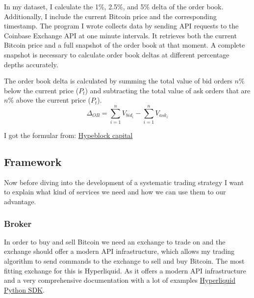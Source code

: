 \documentclass[12pt]{article}
\begin{document}
In my dataset, I calculate the 1\%, 2.5\%, and 5\% delta of the order book. Additionally, I include the current Bitcoin price and the corresponding timestamp. The program I wrote collects data by sending API requests to the Coinbase Exchange API at one minute intervals. It retrieves both the current Bitcoin price and a full snapshot of the order book at that moment. A complete snapshot is necessary to calculate order book deltas at different percentage depths accurately.


\newpage
The order book delta is calculated by summing the total value of bid orders $n\%$ below the current price ($P_t$) and subtracting the total value of ask orders that are $n\%$ above the current price ($P_t$).
\begin{equation*}
    \Delta_{OB} = \sum_{i=1}^{n} V_{bid_i} - \sum_{i=1}^{n} V_{ask_i}
\end{equation*}

I got the formular from: \href{https://academy.hyblockcapital.com/indicators/orderbook/bids-and-asks-delta?utm_source=chatgpt.com}{Hypeblock capital}






\newpage
\subsection*{Framework}
Now before diving into the development of a systematic trading strategy I want to explain what kind of services we need and how we can use them to our advantage.

\subsubsection*{Broker}
In order to buy and sell Bitcoin we need an exchange to trade on and the exchange should offer a modern API infrastructure, which allows my trading algorithm to send commands to the exchange to sell and buy Bitcoin. The most fitting exchange for this is Hyperliquid. As it offers a modern API infrastructure and a very comprehensive documentation with a lot of examples \href{https://github.com/hyperliquid-dex/hyperliquid-python-sdk}{Hyperliquid Python SDK}.   
\end{document}
